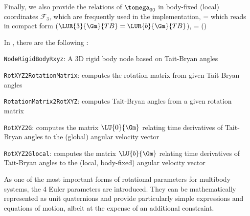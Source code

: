\noindent Finally, we also provide the relations of $\tomega_{30}$ in body-fixed (local) coordinates $\mathcal{F}_3$,
which are frequently used in the implementation,
\be
   =  \vr{\dot{\alpha}}{\dot{\beta}}{\dot{\gamma}} \eqComma
\ee
which reads in compact form ($\LUR{3}{\Gm}{TB} = \LUR{b}{\Gm}{TB}$),
\be
   =  (\tbeta) \dot{\tbeta}
\ee

\noindent In \codeName, there are the following :
\bi
  \item \texttt{NodeRigidBodyRxyz}: A 3D rigid body node based on Tait-Bryan angles
  \item \texttt{RotXYZ2RotationMatrix}: computes the rotation matrix from given Tait-Bryan angles
  \item \texttt{RotationMatrix2RotXYZ}: computes Tait-Bryan angles from a given rotation matrix
  \item \texttt{RotXYZ2G}: computes the matrix $\LU{0}{\Gm}$ relating time derivatives of Tait-Bryan angles to the (global) angular velocity vector
  \item \texttt{RotXYZ2Glocal}: computes the matrix $\LU{b}{\Gm}$ relating time derivatives of Tait-Bryan angles to the (local, body-fixed) angular velocity vector
\ei




As one of the most important forms of rotational parameters for multibody systems, the 4 Euler parameters are introduced.
They can be mathematically represented as unit quaternions and provide particularly simple expressions and equations of motion, albeit at the expense of an additional constraint.

